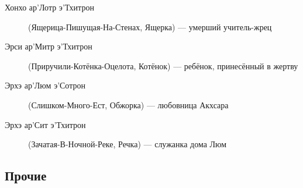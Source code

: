 \documentclass[a4paper,12pt,fleqn]{book}\usepackage{cooltooltips}\usepackage{polyglossia}\setdefaultlanguage[babelshorthands=true]{russian}\setotherlanguage{english}\defaultfontfeatures{Ligatures=TeX,Mapping=tex-text} \usepackage{xcolor}\definecolor{lightgray}{HTML}{bbbbbb}\color{lightgray}\newcommand{\ml}[3]{\textenglish{\textcolor{black}{#3}}}
\begin{document}
{\begin{description}
\item[Хонхо ар’Лотр э’Тхитрон] (Ящерица-Пишущая-На-Стенах, Ящерка) --- умерший учитель-жрец

\item[Эрси ар’Митр э’Тхитрон] (Приручили-Котёнка-Оцелота, Котёнок) --- ребёнок, принесённый в жертву
\item[Эрхэ ар’Люм э’Сотрон] (Слишком-Много-Ест, Обжорка) --- любовница Акхсара
\item[Эрхэ ар’Сит э’Тхитрон] (Зачатая-В-Ночной-Реке, Речка) --- служанка дома Люм
\end{description}

\subsection{Прочие}

}
\end{document}
